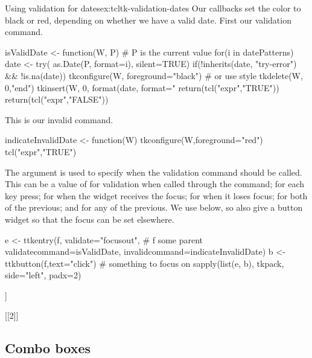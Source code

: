 \begin{example}{Using validation for dates}{ex:tcltk-validation-dates}
Our callbacks set the color to black or red, depending on whether we
have a valid date. First our validation command.
\begin{Schunk}
\begin{Sinput}
 isValidDate <- function(W, P) { # P is the current value
   for(i in datePatterns) {
     date <- try( as.Date(P, format=i), silent=TRUE)
     if(!inherits(date, "try-error") && !is.na(date)) {
       tkconfigure(W, foreground="black")  # or use style
       tkdelete(W, 0,"end")
       tkinsert(W, 0, format(date, format="%
       return(tcl("expr","TRUE"))        
     } 
   }
   return(tcl("expr","FALSE"))
 }
\end{Sinput}
\end{Schunk}

This is our invalid command.
\begin{Schunk}
\begin{Sinput}
 indicateInvalidDate <- function(W) {
   tkconfigure(W,foreground="red")
   tcl("expr","TRUE")
 }
\end{Sinput}
\end{Schunk}


The  argument is used to specify when the
validation command should be called. This can be a value of
 for validation when called through the 
command;  for each key press;  for when the
widget receives the focus;  for when it loses focus;
 for both of the previous; and  for any of the
previous. We use  below, so also give a button widget
so that the focus can be set elsewhere. 
\begin{Schunk}
\begin{Sinput}
 e <- ttkentry(f, validate="focusout", # f some parent
               validatecommand=isValidDate,
               invalidcommand=indicateInvalidDate)
 b <- ttkbutton(f,text="click")        # something to focus on
 sapply(list(e, b), tkpack, side="left", padx=2)
\end{Sinput}
\begin{Soutput}
[[1]]

[[2]]
\end{Soutput}
\end{Schunk}
              
\end{example}


\subsection{Combo boxes}
\label{sec:tcltk:comboboxes}

